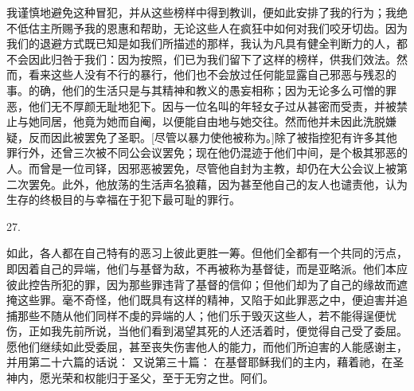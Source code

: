 \par

我谨慎地避免这种冒犯，并从这些榜样中得到教训，便如此安排了我的行为；我绝不低估主所赐予我的恩惠和帮助，无论这些人在疯狂中如何对我们咬牙切齿。因为我们的退避方式既已知是如我们所描述的那样，我认为凡具有健全判断力的人，都不会因此归咎于我们：因为按照，们已为我们留下了这样的榜样，供我们效法。然而，看来这些人没有不行的暴行，他们也不会放过任何能显露自己邪恶与残忍的事。的确，他们的生活只是与其精神和教义的愚妄相称；因为无论多么可憎的罪恶，他们无不厚颜无耻地犯下。因与一位名叫的年轻女子过从甚密而受责，并被禁止与她同居，他竟为她而自阉，以便能自由地与她交往。然而他并未因此洗脱嫌疑，反而因此被罢免了圣职。[尽管以暴力使他被称为。]除了被指控犯有许多其他罪行外，还曾三次被不同公会议罢免；现在他仍混迹于他们中间，是个极其邪恶的人。而曾是一位司铎，因邪恶被罢免，尽管他自封为主教，却仍在大公会议上被第二次罢免。此外，他放荡的生活声名狼藉，因为甚至他自己的友人也谴责他，认为生存的终极目的与幸福在于犯下最可耻的罪行。\par

27. \par

如此，各人都在自己特有的恶习上彼此更胜一筹。但他们全都有一个共同的污点，即因着自己的异端，他们与基督为敌，不再被称为基督徒，而是亚略派。他们本应彼此控告所犯的罪，因为那些罪违背了基督的信仰；但他们却为了自己的缘故而遮掩这些罪。毫不奇怪，他们既具有这样的精神，又陷于如此罪恶之中，便迫害并追捕那些不随从他们同样不虔的异端的人；他们乐于毁灭这些人，若不能得逞便忧伤，正如我先前所说，当他们看到渴望其死的人还活着时，便觉得自己受了委屈。愿他们继续如此受委屈，甚至丧失伤害他人的能力，而他们所迫害的人能感谢主，并用第二十六篇的话说： 又说第三十篇： 在基督耶稣我们的主内，藉着祂，在圣神内，愿光荣和权能归于圣父，至于无穷之世。阿们。\par

